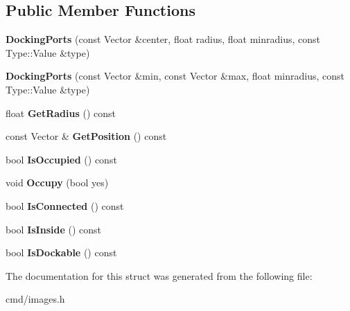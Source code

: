 \subsection*{Public Member Functions}
\begin{DoxyCompactItemize}
\item 
{\bfseries Docking\+Ports} (const Vector \&center, float radius, float minradius, const Type\+::\+Value \&type)\hypertarget{structDockingPorts_afca49998d5fb641aaccf799f8426fcee}{}\label{structDockingPorts_afca49998d5fb641aaccf799f8426fcee}

\item 
{\bfseries Docking\+Ports} (const Vector \&min, const Vector \&max, float minradius, const Type\+::\+Value \&type)\hypertarget{structDockingPorts_a9670211edbe0d15134af5c1341d076ef}{}\label{structDockingPorts_a9670211edbe0d15134af5c1341d076ef}

\item 
float {\bfseries Get\+Radius} () const \hypertarget{structDockingPorts_ad61e47dcda081d0a84ebbebbc69edb11}{}\label{structDockingPorts_ad61e47dcda081d0a84ebbebbc69edb11}

\item 
const Vector \& {\bfseries Get\+Position} () const \hypertarget{structDockingPorts_aa5ca32570397af91c40f76937743bea7}{}\label{structDockingPorts_aa5ca32570397af91c40f76937743bea7}

\item 
bool {\bfseries Is\+Occupied} () const \hypertarget{structDockingPorts_ae7ab03307a5c2ec7220a9d7c7986d11d}{}\label{structDockingPorts_ae7ab03307a5c2ec7220a9d7c7986d11d}

\item 
void {\bfseries Occupy} (bool yes)\hypertarget{structDockingPorts_a9a83a56bd6187ac127a42d55ccfb791f}{}\label{structDockingPorts_a9a83a56bd6187ac127a42d55ccfb791f}

\item 
bool {\bfseries Is\+Connected} () const \hypertarget{structDockingPorts_a95beaf7651327049f05e9f6719322783}{}\label{structDockingPorts_a95beaf7651327049f05e9f6719322783}

\item 
bool {\bfseries Is\+Inside} () const \hypertarget{structDockingPorts_a44f19387df2d8759def1b4fba6bbb83c}{}\label{structDockingPorts_a44f19387df2d8759def1b4fba6bbb83c}

\item 
bool {\bfseries Is\+Dockable} () const \hypertarget{structDockingPorts_a00193704fbcfaf95685bf1b7bdd32fbd}{}\label{structDockingPorts_a00193704fbcfaf95685bf1b7bdd32fbd}

\end{DoxyCompactItemize}


The documentation for this struct was generated from the following file\+:\begin{DoxyCompactItemize}
\item 
cmd/images.\+h\end{DoxyCompactItemize}
